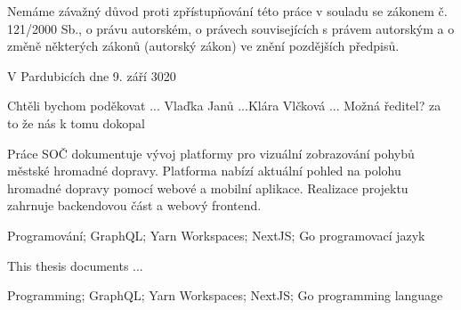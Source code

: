 \noindent Nemáme závažný důvod proti zpřístupňování této práce v souladu se zákonem č. 121/2000 Sb., o právu autorském, o právech souvisejících s právem autorským a o změně některých zákonů (autorský zákon) ve znění pozdějších předpisů. 

\vspace{24 pt}

\noindent V Pardubicích dne 9. září 3020 \dotfill{} 

\hspace{5.75cm} \authorName

\cleardoublepage

\vspace*{0.8\textheight}

\noindent
Chtěli bychom poděkovat ... Vlaďka Janů ...Klára Vlčková ... Možná ředitel? za to že nás k tomu dokopal

\cleardoublepage


\noindent Práce SOČ dokumentuje vývoj platformy pro vizuální zobrazování pohybů městské hromadné dopravy. Platforma nabízí aktuální pohled na polohu hromadné dopravy pomocí webové a mobilní aplikace. Realizace projektu zahrnuje backendovou část a webový frontend.

\vspace{18pt}


\noindent Programování; GraphQL; Yarn Workspaces; NextJS; Go programovací jazyk
\vspace{18pt}


\noindent This thesis documents ...

\vspace{18pt}


\noindent Programming; GraphQL; Yarn Workspaces; NextJS; Go programming language

\cleardoublepage